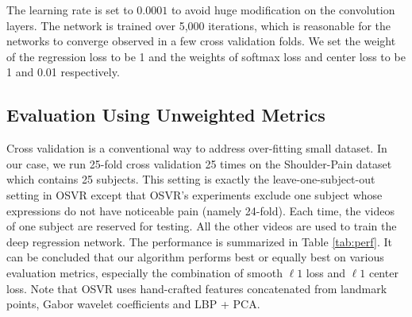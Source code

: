 \documentclass{article}
\begin{document}
The learning rate is set to $0.0001$ to avoid huge modification on the convolution layers. The network is trained over 5,000 iterations, which is reasonable for the networks to converge observed in a few cross validation folds. We set the weight of the regression loss to be 1 and the weights of softmax loss and center loss to be 1 and 0.01 respectively.

\subsection{Evaluation Using Unweighted Metrics}
\vspace{-2mm}

Cross validation is a conventional way to address over-fitting small dataset.
In our case, we run 25-fold cross validation 25 times on the Shoulder-Pain dataset which contains 25 subjects. 
This setting is exactly the leave-one-subject-out setting in OSVR \cite{Zhao_2016_CVPR} except that OSVR's experiments exclude one subject whose expressions do not have noticeable pain (namely 24-fold).
Each time, the videos of one subject are reserved for testing.
All the other videos are used to train the deep regression network.
The performance is summarized in Table \ref{tab:perf}. It can be concluded that our algorithm performs best or equally best on various evaluation metrics, especially the combination of smooth $\ell 1$ loss and $\ell 1$ center loss. Note that OSVR \cite{Zhao_2016_CVPR} uses hand-crafted features concatenated from landmark points, Gabor wavelet coefficients and LBP + PCA.
\end{document}
